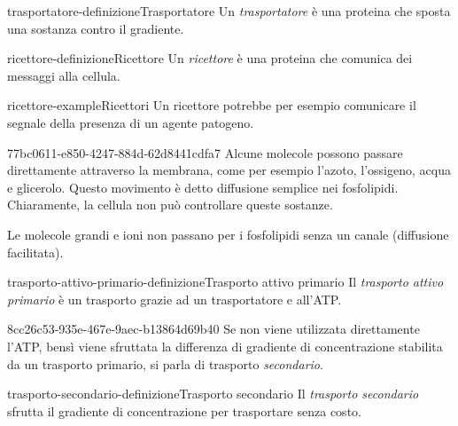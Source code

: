 \documentclass[preview]{standalone}
\begin{document}
\begin{snippetdefinition}{trasportatore-definizione}{Trasportatore}
    Un \textit{trasportatore} è una proteina che sposta una sostanza contro il gradiente.
\end{snippetdefinition}


\begin{snippetdefinition}{ricettore-definizione}{Ricettore}
    Un \textit{ricettore} è una proteina che comunica dei messaggi alla cellula.
\end{snippetdefinition}

\begin{snippetexample}{ricettore-example}{Ricettori}
    Un ricettore potrebbe per esempio comunicare il segnale della presenza di un agente patogeno.
\end{snippetexample}

\begin{snippet}{77bc0611-e850-4247-884d-62d8441cdfa7}
    Alcune molecole possono passare direttamente attraverso la membrana, come per esempio l'azoto, l'ossigeno, acqua e glicerolo.
    Questo movimento è detto diffusione semplice nei fosfolipidi. Chiaramente, la cellula non può controllare queste sostanze.

    Le molecole grandi e ioni non passano per i fosfolipidi senza un canale (diffusione facilitata).

\end{snippet}

\begin{snippetdefinition}{trasporto-attivo-primario-definizione}{Trasporto attivo primario}
    Il \textit{trasporto attivo primario} è un trasporto grazie ad un trasportatore e all'ATP.
\end{snippetdefinition}

\begin{snippet}{8cc26c53-935e-467e-9aec-b13864d69b40}
    Se non viene utilizzata direttamente l'ATP,
    bensì viene sfruttata la differenza di gradiente di concentrazione stabilita da un trasporto primario,
    si parla di trasporto \textit{secondario}.
\end{snippet}

\begin{snippetdefinition}{trasporto-secondario-definizione}{Trasporto secondario}
    Il \textit{trasporto secondario} sfrutta il gradiente di concentrazione per trasportare
    senza costo.
\end{snippetdefinition}
\end{document}
